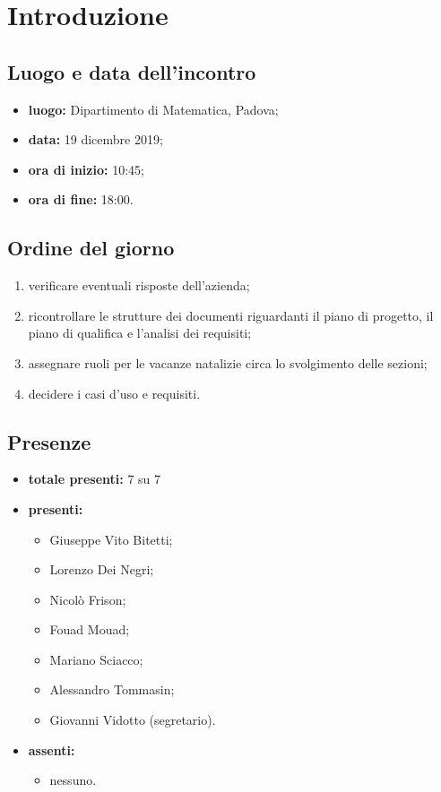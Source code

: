 \section*{Introduzione}

\subsection*{Luogo e data dell'incontro}
	\begin{itemize}
		\item \textbf{luogo:} Dipartimento di Matematica, Padova;
		\item \textbf{data:} 19 dicembre 2019;
		\item \textbf{ora di inizio:} 10:45;
		\item \textbf{ora di fine:} 18:00.
	\end{itemize}

\subsection*{Ordine del giorno}
	\begin{enumerate}
		\item verificare eventuali risposte dell'azienda;
		\item ricontrollare le strutture dei documenti riguardanti il piano di progetto, il piano di qualifica e l'analisi dei requisiti;
		\item assegnare ruoli per le vacanze natalizie circa lo svolgimento delle sezioni;
		\item decidere i casi d'uso e requisiti.
	\end{enumerate}

\subsection*{Presenze}
	\begin{itemize}
		\item \textbf{totale presenti:} 7 su 7
		\item \textbf{presenti:}
			\begin{itemize}			
				\item Giuseppe Vito Bitetti;
				\item Lorenzo Dei Negri;
				\item Nicolò Frison;
				\item Fouad Mouad;
				\item Mariano Sciacco;
				\item Alessandro Tommasin;
				\item Giovanni Vidotto (segretario).
			\end{itemize}
		\item \textbf{assenti:} 
			\begin{itemize}	
				\item nessuno.
			\end{itemize}
	\end{itemize}


